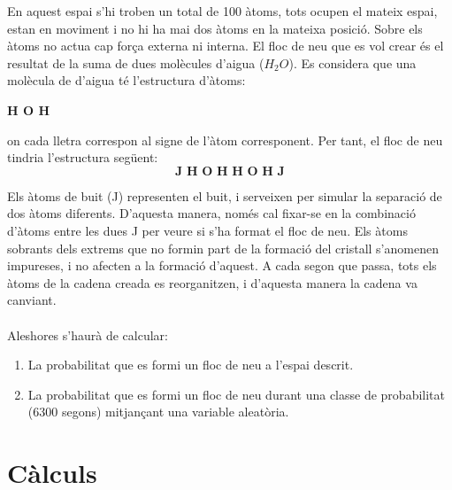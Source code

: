 \documentclass[12pt]{report}
\begin{document}
En aquest espai s’hi troben un total de 100 àtoms, tots ocupen el mateix espai, estan en moviment i no hi ha mai dos àtoms en la mateixa posició. Sobre els àtoms no actua cap força externa ni interna.
\newline
El floc de neu que es vol crear és el resultat de la suma de dues molècules d’aigua ($H_2O$). Es considera que una molècula de d’aigua té l’estructura d’àtoms:
\begin{center}
    \textbf{H O H}
\end{center}
on cada lletra correspon al signe de l’àtom corresponent. Per tant, el floc de neu tindria l’estructura següent:
\begin{equation}
    \textbf{J H O H H O H J} 
    \label{eq:cristall}
\end{equation}

Els àtoms de buit (J) representen el buit, i serveixen per simular la separació de dos àtoms diferents. D’aquesta manera, només cal fixar-se en la combinació d’àtoms entre les dues J per veure si s’ha format el floc de neu.  Els àtoms sobrants dels extrems que no formin part de la formació del cristall s’anomenen impureses, i no afecten a la formació d’aquest.
\newline
A cada segon que passa, tots els àtoms de la cadena creada es reorganitzen, i d’aquesta manera la cadena va canviant. 
\\\\
Aleshores s'haurà de calcular:
\begin{enumerate}
    \item La probabilitat que es formi un floc de neu a l'espai descrit.
    \item La probabilitat que es formi un floc de neu durant una classe de probabilitat (6300 segons) mitjançant una variable aleatòria.

\end{enumerate}

\chapter{Càlculs}
\end{document}
